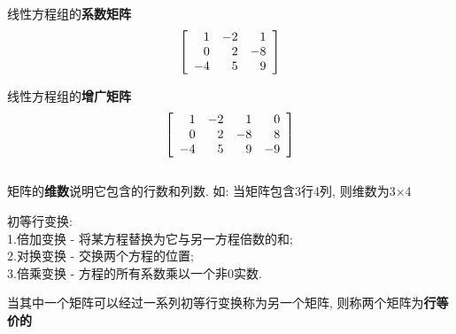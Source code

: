 线性方程组的\textbf{系数矩阵}
\[\left[\begin{array}{r r r}
	1 & -2 & 1\\
	0 & 2  & -8\\
	-4 & 5 & 9
\end{array}\right]\]

线性方程组的\textbf{增广矩阵}
\[\left[\begin{array}{r r r r}
	1 & -2 & 1 & 0\\
	0 & 2  & -8 & 8\\
	-4 & 5 & 9 & -9
\end{array}\right]\]\\[2ex]

矩阵的\textbf{维数}说明它包含的行数和列数. 如: 当矩阵包含3行4列, 则维数为3$\times$4\\[2ex]

\begin{center}
\begin{boxedminipage}{10cm}
初等行变换:\\
1.倍加变换 - 将某方程替换为它与另一方程倍数的和;\\
2.对换变换 - 交换两个方程的位置;\\
3.倍乘变换 - 方程的所有系数乘以一个非0实数.
\end{boxedminipage}
\end{center}

当其中一个矩阵可以经过一系列初等行变换称为另一个矩阵, 则称两个矩阵为\textbf{行等价的}\\


